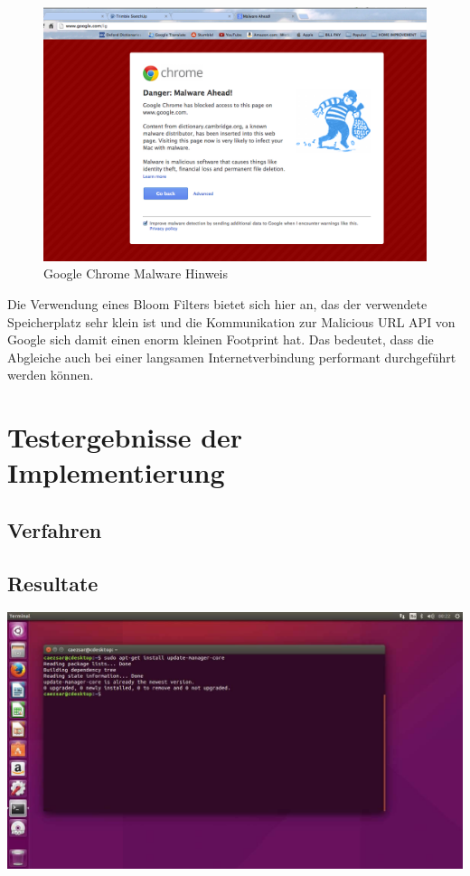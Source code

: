 \documentclass[12pt,a4paper]{report}
\begin{document}
    \begin{figure}[h!]
    \includegraphics[width=\textwidth]{assets/google_malware.png}
    \caption{Google Chrome Malware Hinweis}
      \label{fig:boat1}
    \end{figure}
    
Die Verwendung eines Bloom Filters bietet sich hier an, das der verwendete Speicherplatz sehr klein ist und die Kommunikation zur Malicious URL API von Google sich damit einen enorm kleinen Footprint hat. Das bedeutet, dass die Abgleiche auch bei einer langsamen Internetverbindung performant durchgeführt werden können.


\chapter{Testergebnisse der Implementierung}\label{ch:testergebnisse-der-implementierung}
\section{Verfahren}\label{sec:verfahren}
\section{Resultate}\label{sec:resultate}
\includegraphics[width=\textwidth]{assets/results.jpg}
\end{document}
